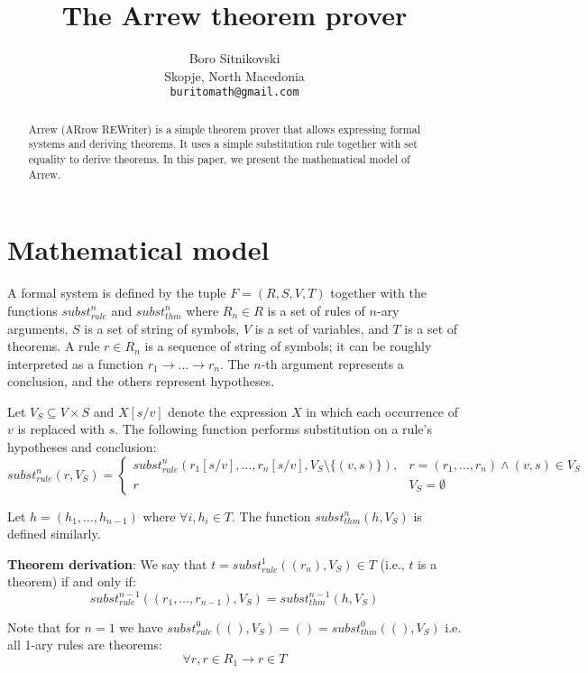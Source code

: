 \documentclass{article}
\title{The Arrew theorem prover}
\author{
  Boro Sitnikovski \\
  Skopje, North Macedonia \\
  \texttt{buritomath@gmail.com} \\
}
\begin{document}
\maketitle

\begin{abstract}
Arrew (ARrow REWriter) is a simple theorem prover that allows expressing formal systems and deriving theorems. It uses a simple substitution rule together with set equality to derive theorems. In this paper, we present the mathematical model of Arrew.
\end{abstract}


\section{Mathematical model}

A formal system is defined by the tuple $F = (R, S, V, T)$ together with the functions $subst_{rule}^n$ and $subst_{thm}^n$ where $R_n \in R$ is a set of rules of $n$-ary arguments, $S$ is a set of string of symbols, $V$ is a set of variables, and $T$ is a set of theorems. A rule $r \in R_n$ is a sequence of string of symbols; it can be roughly interpreted as a function $r_1 \to \ldots \to r_n$. The $n$-th argument represents a conclusion, and the others represent hypotheses.

Let $V_S \subseteq V \times S$ and $X[s/v]$ denote the expression $X$ in which each occurrence of $v$ is replaced with $s$. The following function performs substitution on a rule's hypotheses and conclusion:
$$ subst_{rule}^n(r, V_S) = {
\begin{cases}
subst_{rule}^n(r_1[s/v], \ldots, r_n[s/v], V_S \setminus \{(v, s) \}), & r = (r_1, \ldots, r_n) \land (v, s) \in V_S \\
r & V_S = \emptyset
\end{cases}}
$$

Let $h = (h_1, \ldots, h_{n-1})$ where $\forall i, h_i \in T$. The function $subst_{thm}^n(h, V_S)$ is defined similarly.

\textbf{Theorem derivation}: We say that $t = subst_{rule}^1((r_n), V_S) \in T$ (i.e., $t$ is a theorem) if and only if:
$$subst_{rule}^{n-1}((r_1, \ldots, r_{n-1}), V_S) = subst_{thm}^{n-1}(h, V_S)$$

Note that for $n = 1$ we have $subst_{rule}^0((), V_S) = () = subst_{thm}^0((), V_S)$ i.e. all 1-ary rules are theorems:
$$\forall r, r \in R_1 \to r \in T$$
\end{document}
